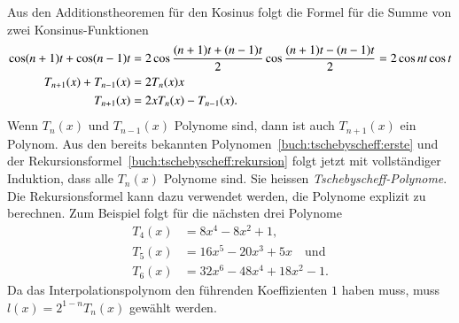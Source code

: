 Aus den Additionstheoremen für den Kosinus folgt die Formel für die
Summe von zwei Konsinus-Funktionen
%
\begin{align}
\cos (n+1)t + \cos(n-1)t
&=
2 \cos \frac{(n+1)t + (n-1)t}2 \cos \frac{(n+1)t -(n-1)t}2
=
2\cos nt \cos t
\notag
\\
T_{n+1}(x)+T_{n-1}(x)&=2T_n(x)x
\notag
\\
T_{n+1}(x) &= 2xT_n(x) - T_{n-1}(x).
\label{buch:tschebyscheff:rekursion}
\end{align}
Wenn $T_n(x)$ und $T_{n-1}(x)$ Polynome sind, dann ist auch $T_{n+1}(x)$
ein Polynom.
Aus den bereits bekannten Polynomen~\eqref{buch:tschebyscheff:erste} und
der Rekursionsformel~\eqref{buch:tschebyscheff:rekursion} folgt jetzt mit
vollständiger Induktion, dass alle $T_n(x)$ Polynome sind.
%
%
Sie heissen {\em Tschebyscheff-Polynome}.
%
Die Rekursionsformel kann dazu verwendet werden, die Polynome explizit
zu berechnen.
Zum Beispiel folgt für die nächsten drei Polynome
\begin{align*}
T_4(x) &= 8x^4-8x^2 + 1,
\\
T_5(x) &= 16x^5-20x^3+5x \quad\text{und}
\\
T_6(x) &= 32x^6-48x^4+18x^2-1.
\end{align*}
Da das Interpolationspolynom den führenden Koeffizienten $1$ haben muss,
muss $l(x) = 2^{1-n}T_n(x)$ gewählt werden.


